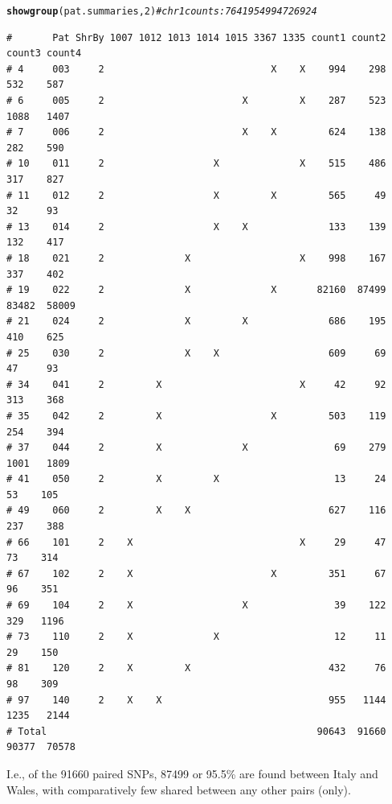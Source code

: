 \documentclass{article}\usepackage[]{graphicx}\usepackage[]{color}
\makeatletter
\newcommand{\hlnum}[1]{\textcolor[rgb]{0.686,0.059,0.569}{#1}}%
\newcommand{\hlcom}[1]{\textcolor[rgb]{0.678,0.584,0.686}{\textit{#1}}}%
\newcommand{\hlstd}[1]{\textcolor[rgb]{0.345,0.345,0.345}{#1}}%
\newcommand{\hlkwd}[1]{\textcolor[rgb]{0.737,0.353,0.396}{\textbf{#1}}}%
\newenvironment{kframe}{%
 \def\at@end@of@kframe{}%
 \ifinner\ifhmode%
  \def\at@end@of@kframe{\end{minipage}}%
  \begin{minipage}{\columnwidth}%
 \fi\fi%
 \def\FrameCommand##1{\hskip\@totalleftmargin \hskip-\fboxsep
 \colorbox{shadecolor}{##1}\hskip-\fboxsep
     \hskip-\linewidth \hskip-\@totalleftmargin \hskip\columnwidth}%
 \MakeFramed {\advance\hsize-\width
   \@totalleftmargin\z@ \linewidth\hsize
   \@setminipage}}%
 {\par\unskip\endMakeFramed%
 \at@end@of@kframe}
\newenvironment{knitrout}{}{} %
\makeatother
\begin{document}
\begin{knitrout}\footnotesize
{}\color{fgcolor}\begin{kframe}
\begin{alltt}
\hlkwd{showgroup}\hlstd{(pat.summaries,}\hlnum{2}\hlstd{)} \hlcom{# chr 1 counts: 7641   9549   9472  6924}
\end{alltt}
\begin{verbatim}
#       Pat ShrBy 1007 1012 1013 1014 1015 3367 1335 count1 count2 count3 count4
# 4     003     2                             X    X    994    298    532    587
# 6     005     2                        X         X    287    523   1088   1407
# 7     006     2                        X    X         624    138    282    590
# 10    011     2                   X              X    515    486    317    827
# 11    012     2                   X         X         565     49     32     93
# 13    014     2                   X    X              133    139    132    417
# 18    021     2              X                   X    998    167    337    402
# 19    022     2              X              X       82160  87499  83482  58009
# 21    024     2              X         X              686    195    410    625
# 25    030     2              X    X                   609     69     47     93
# 34    041     2         X                        X     42     92    313    368
# 35    042     2         X                   X         503    119    254    394
# 37    044     2         X              X               69    279   1001   1809
# 41    050     2         X         X                    13     24     53    105
# 49    060     2         X    X                        627    116    237    388
# 66    101     2    X                             X     29     47     73    314
# 67    102     2    X                        X         351     67     96    351
# 69    104     2    X                   X               39    122    329   1196
# 73    110     2    X              X                    12     11     29    150
# 81    120     2    X         X                        432     76     98    309
# 97    140     2    X    X                             955   1144   1235   2144
# Total                                               90643  91660  90377  70578
\end{verbatim}
\end{kframe}
\end{knitrout}

I.e., of the 91660 paired SNPs, 87499 or
95.5\% are found between Italy
and Wales, with comparatively few shared between any other pairs (only).
\end{document}
